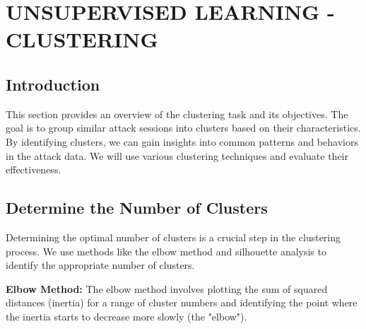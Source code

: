 

\section{UNSUPERVISED LEARNING - CLUSTERING}


    \subsection{Introduction}
    
        This section provides an overview of the clustering task and its objectives. The goal is to group similar attack sessions into clusters based on their characteristics. By identifying clusters, we can gain insights into common patterns and behaviors in the attack data. We will use various clustering techniques and evaluate their effectiveness.

    \subsection{Determine the Number of Clusters}
    
        Determining the optimal number of clusters is a crucial step in the clustering process. We use methods like the elbow method and silhouette analysis to identify the appropriate number of clusters.

        \textbf{Elbow Method:} The elbow method involves plotting the sum of squared distances (inertia) for a range of cluster numbers and identifying the point where the inertia starts to decrease more slowly (the "elbow").


